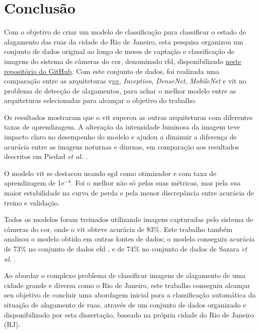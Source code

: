 \chapter{Conclusão}\label{cap:conclusoes}

Com o objetivo de criar um modelo de classificação para classificar o estado de alagamento das ruas da cidade do Rio de Janeiro,
esta pesquisa organizou um conjunto de dados original ao longo de meses de captação e classificação de imagens do sistema de câmeras do \acrshort{cor}, denominado \acrshort{rfd}, disponibilizado \href{https://github.com/afego/computervision}{neste repositório do GitHub}.
Com este conjunto de dados, foi realizada uma comparação entre as arquiteturas \acrshort{vgg}, \textit{Inception}, \textit{DenseNet}, \textit{MobileNet} e \Acrshort{vit} no problema de detecção de alagamentos,
para achar o melhor modelo entre as arquiteturas selecionadas para alcançar o objetivo do trabalho.

Os resultados mostraram que o \acrshort{vit} superou as outras arquiteturas com diferentes taxas de aprendizagem.
A alteração da intensidade luminosa da imagem teve impacto claro no desempenho do modelo e ajudou a diminuir a diferença de acurácia entre as imagens noturnas e diurnas,
em comparação aos resultados descritos em Piedad \textit{et al.} \cite{piedad2022}.

O modelo \acrshort{vit} se destacou usando \acrshort{sgd} como otimizador e com taxa de aprendizagem de 1e$^{-4}$.
Foi o melhor não só pelas suas métricas, mas pela sua maior estabilidade na curva de perda e pela menor discrepância entre acurácia de treino e validação.

Todos os modelos foram treinados utilizando imagens capturadas pelo sistema de câmeras do \acrshort{cor}, onde o \acrshort{vit} obteve acurácia de 83\%.
Este trabalho também analisou o modelo obtido em outras fontes de dados; o modelo conseguiu acurácia de 73\% no conjunto de dados \acrshort{efd} \cite{BarzSchroeterMuench2018_1000117723},
e de 74\% no conjunto de dados de Sazara \textit{et al.} \cite{sazara2019}.

Ao abordar o complexo problema de classificar imagens de alagamento de uma cidade grande e diversa como o Rio de Janeiro,
este trabalho conseguiu alcançar seu objetivo de concluir uma abordagem inicial para a classificação automática da situação de alagamento de ruas,
através de um conjunto de dados organizado e disponibilizado por esta dissertação, baseado na própria cidade do Rio de Janeiro (RJ).

